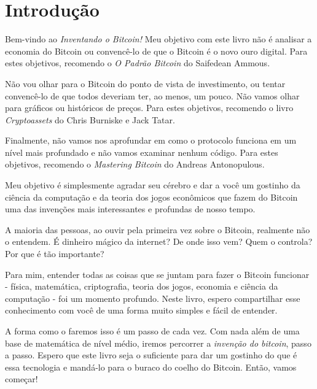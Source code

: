 \chapter*{Introdução}
\label{ch:introducao}

Bem-vindo ao \textit{Inventando o Bitcoin!} Meu objetivo com este livro não é analisar a economia do Bitcoin ou convencê-lo de que o Bitcoin é o novo ouro digital. Para estes objetivos, recomendo o \textit{O Padrão Bitcoin} do Saifedean Ammous.

Não vou olhar para o Bitcoin do ponto de vista de investimento, ou tentar convencê-lo de que todos deveriam ter, ao menos, um pouco. Não vamos olhar para gráficos ou históricos de preços. Para estes objetivos, recomendo o livro \textit{Cryptoassets} do Chris Burniske e Jack Tatar.

Finalmente, não vamos nos aprofundar em como o protocolo funciona em um nível mais profundado e não vamos examinar nenhum código. Para estes objetivos, recomendo o \textit{Mastering Bitcoin} do Andreas Antonopulous.

Meu objetivo é simplesmente agradar seu cérebro e dar a você um gostinho da ciência da computação e da teoria dos jogos econômicos que fazem do Bitcoin uma das invenções mais interessantes e profundas de nosso tempo.

A maioria das pessoas, ao ouvir pela primeira vez sobre o Bitcoin, realmente não o entendem. É dinheiro mágico da internet? De onde isso vem? Quem o controla? Por que é tão importante?

Para mim, entender todas as coisas que se juntam para fazer o Bitcoin funcionar - física, matemática, criptografia, teoria dos jogos, economia e ciência da computação - foi um momento profundo. Neste livro, espero compartilhar esse conhecimento com você de uma forma muito simples e fácil de entender.

A forma como o faremos isso é um passo de cada vez. Com nada além de uma base de matemática de nível médio, iremos percorrer a \textit{invenção do bitcoin}, passo a passo. Espero que este livro seja o suficiente para dar um gostinho do que é essa tecnologia e mandá-lo para o buraco do coelho do Bitcoin. Então, vamos começar!